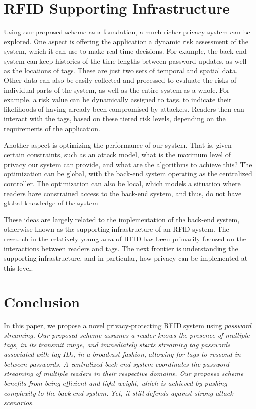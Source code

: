 \section{RFID Supporting Infrastructure}
\label{sec:Supporting_Infrastructure}
Using our proposed scheme as a foundation, a much richer privacy system can be explored.  One aspect is offering the application a dynamic risk assessment of the system, which it can use to make real-time decisions.  For example, the back-end system can keep histories of the time lengths between password updates, as well as the locations of tags.  These are just two sets of temporal and spatial data.  Other data can also be easily collected and processed to evaluate the risks of individual parts of the system, as well as the entire system as a whole.  For example, a risk value can be dynamically assigned to tags, to indicate their likelihoods of having already been compromised by attackers.  Readers then can interact with the tags, based on these tiered risk levels, depending on the requirements of the application.

Another aspect is optimizing the performance of our system.  That is, given certain constraints, such as an attack model, what is the maximum level of privacy our system can provide, and what are the algorithms to achieve this?  The optimization can be global, with the back-end system operating as the centralized controller.  The optimization can also be local, which models a situation where readers have constrained access to the back-end system, and thus, do not have global knowledge of the system.

These ideas are largely related to the implementation of the back-end system, otherwise known as the supporting infrastructure of an RFID system.  The research in the relatively young area of RFID has been primarily focused on the interactions between readers and tags.  The next frontier is understanding the supporting infrastructure, and in particular, how privacy can be implemented at this level.

\section{Conclusion}
\label{sec:Conclusion}
In this paper, we propose a novel privacy-protecting RFID system using \em password streaming\em.  Our proposed scheme assumes a reader knows the presence of multiple tags, in its transmit range, and immediately starts streaming tag passwords associated with tag IDs, in a broadcast fashion, allowing for tags to respond in between passwords.  A centralized back-end system coordinates the password streaming of multiple readers in their respective domains.  Our proposed scheme benefits from being efficient and light-weight, which is achieved by pushing complexity to the back-end system.  Yet, it still defends against strong attack scenarios.

